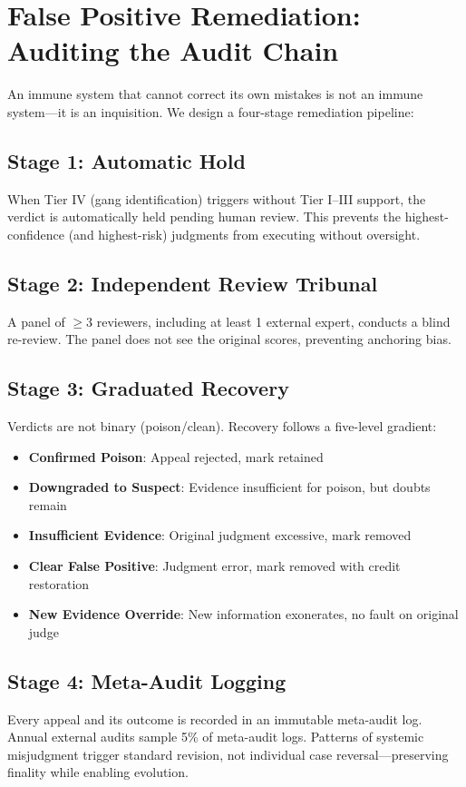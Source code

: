 \documentclass[11pt]{article}
\begin{document}
\section{False Positive Remediation: Auditing the Audit Chain}

An immune system that cannot correct its own mistakes is not an immune system---it is 
an inquisition. We design a four-stage remediation pipeline:

\subsection{Stage 1: Automatic Hold}
When Tier IV (gang identification) triggers without Tier I--III support, the verdict 
is automatically held pending human review. This prevents the highest-confidence 
(and highest-risk) judgments from executing without oversight.

\subsection{Stage 2: Independent Review Tribunal}
A panel of $\geq 3$ reviewers, including at least 1 external expert, conducts a blind 
re-review. The panel does not see the original scores, preventing anchoring bias.

\subsection{Stage 3: Graduated Recovery}
Verdicts are not binary (poison/clean). Recovery follows a five-level gradient:
\begin{itemize}
  \item \textbf{Confirmed Poison}: Appeal rejected, mark retained
  \item \textbf{Downgraded to Suspect}: Evidence insufficient for poison, but doubts remain
  \item \textbf{Insufficient Evidence}: Original judgment excessive, mark removed
  \item \textbf{Clear False Positive}: Judgment error, mark removed with credit restoration
  \item \textbf{New Evidence Override}: New information exonerates, no fault on original judge
\end{itemize}

\subsection{Stage 4: Meta-Audit Logging}
Every appeal and its outcome is recorded in an immutable meta-audit log. Annual external 
audits sample 5\% of meta-audit logs. Patterns of systemic misjudgment trigger standard 
revision, not individual case reversal---preserving finality while enabling evolution.
\end{document}
